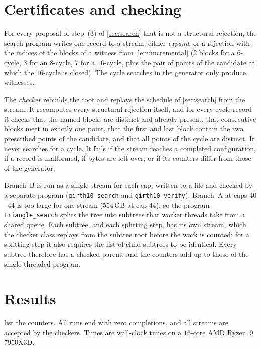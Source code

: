 \documentclass[11pt]{amsart}
\theoremstyle{definition}
\theoremstyle{remark}
\newcommand{\code}[1]{\texttt{#1}}
\begin{document}
\section{Certificates and checking}\label{sec:certs}

For every proposal of step~(3) of \cref{sec:search} that is not a structural
rejection, the search program writes one record to a stream: either \emph{expand}, or a rejection with the
indices of the blocks of a witness from \cref{lem:incremental} ($2$ blocks for
a $6$-cycle, $3$ for an $8$-cycle, $7$ for a $16$-cycle, plus the pair of
points of the candidate at which the $16$-cycle is closed). The cycle searches in
the generator only produce witnesses.

The \emph{checker} rebuilds the root and replays the schedule of
\cref{sec:search} from the stream. It recomputes every structural rejection
itself, and for every cycle record it checks that the named blocks are distinct
and already present, that consecutive blocks meet in exactly one point, that the
first and last block contain the two prescribed points of the candidate, and
that all points of the cycle are distinct. It never searches for a cycle. It
fails if the stream reaches a completed configuration, if a record is malformed,
if bytes are left over, or if its counters differ from those of the generator.

Branch~B is run as a single stream for each cap, written to a file and checked
by a separate program (\code{girth10\_search} and \code{girth10\_verify}).
Branch~A at caps $40$--$44$ is too large for one stream ($554$\,GB at cap $44$),
so the program \code{triangle\_search} splits the tree into subtrees that
worker threads take from a shared queue. Each subtree, and each splitting step,
has its own stream, which the checker class replays from the subtree root
before the work is counted; for a splitting step it also requires the list of
child subtrees to be identical. Every subtree therefore has a checked parent,
and the counters add up to those of the single-threaded program.

\section{Results}\label{sec:results}

 list the counters. All runs end with zero
completions, and all streams are accepted by the checkers. Times are wall-clock
times on a $16$-core AMD Ryzen~9 7950X3D.
\end{document}
